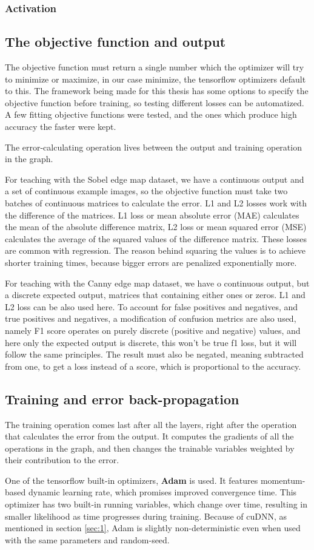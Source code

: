 \documentclass[12pt]{report}
\begin{document}
\subsubsection{Activation}
\subsection{The objective function and output}
The objective function must return a single number which the optimizer will try to minimize or maximize, in our case minimize, the tensorflow optimizers default to this. The framework being made for this thesis has some options to specify the objective function before training, so testing different losses can be automatized. A few fitting objective functions were tested, and the ones which produce high accuracy the faster were kept.\par
The error-calculating operation lives between the output and training operation in the graph.\par
For teaching with the Sobel edge map dataset, we have a continuous output and a set of continuous example images, so the objective function must take two batches of continuous matrices to calculate the error. L1 and L2 losses work with the difference of the matrices. L1 loss or mean absolute error (MAE) calculates the mean of the absolute difference matrix, L2 loss or mean squared error (MSE) calculates the average of the squared values of the difference matrix. These losses are common with regression. The reason behind squaring the values is to achieve shorter training times, because bigger errors are penalized exponentially more.\par
For teaching with the Canny edge map dataset, we have o continuous output, but a discrete expected output, matrices that containing either ones or zeros. L1 and L2 loss can be also used here. To account for false positives and negatives, and true positives and negatives, a modification of confusion metrics are also used, namely F1 score operates on purely discrete (positive and negative) values, and here only the expected output is discrete, this won't be true f1 loss, but it will follow the same principles. The result must also be negated, meaning subtracted from one, to get a loss instead of a score, which is proportional to the accuracy.
\subsection{Training and error back-propagation} \label{sec:2}
The training operation comes last after all the layers, right after the operation that calculates the error from the output. It computes the gradients of all the operations in the graph, and then changes the trainable variables weighted by their contribution to the error.\par
One of the tensorflow built-in optimizers, \textbf{Adam} is used. It features momentum-based dynamic learning rate, which promises improved convergence time. This optimizer has two built-in running variables, which change over time, resulting in smaller likelihood as time progresses during training. Because of cuDNN, as mentioned in section \ref{sec:1}, Adam is slightly non-deterministic even when used with the same parameters and random-seed.
\end{document}
